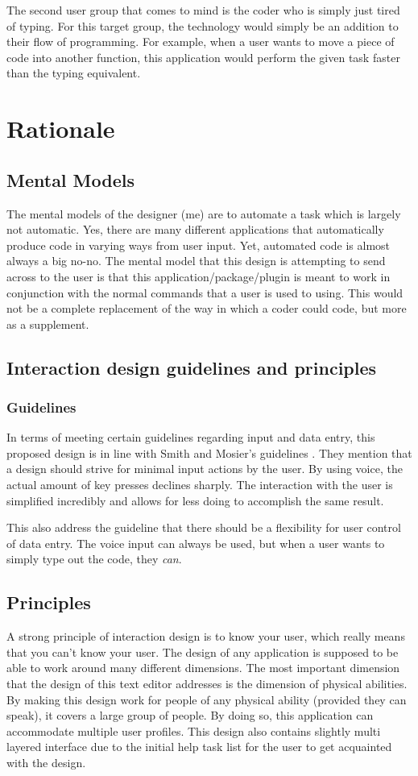 \documentclass[11pt, oneside]{article}
\begin{document}
The second user group that comes to mind is the coder who is simply just tired of typing. For this target group, the technology would simply be an addition to their flow of programming. For example, when a user wants to move a piece of code into another function, this application would perform the given task faster than the typing equivalent.


\section{Rationale}

\subsection{Mental Models}
The mental models of the designer (me) are to automate a task which is largely not automatic. Yes, there are many different applications that automatically produce code in varying ways from user input. Yet, automated code is almost always a big no-no. The mental model that this design is attempting to send across to the user is that this application/package/plugin is meant to work in conjunction with the normal commands that a user is used to using. This would not be a complete replacement of the way in which a coder could code, but more as a supplement.

\subsection{Interaction design guidelines and principles}
\subsubsection{Guidelines}
In terms of meeting certain guidelines regarding input and data entry, this proposed design is in line with Smith and Mosier's guidelines \cite{guidelines}. They mention that a design should strive for minimal input actions by the user. By using voice, the actual amount of key presses declines sharply. The interaction with the user is simplified incredibly and allows for less doing to accomplish the same result.

This also address the guideline that there should be a flexibility for user control of data entry. The voice input can always be used, but when a user wants to simply type out the code, they \textit{can}.

\subsection{Principles}
A strong principle of interaction design is to know your user, which really means that you can't know your user. The design of any application is supposed to be able to work around many different dimensions. The most important dimension that the design of this text editor addresses is the dimension of physical abilities. By making this design work for people of any physical ability (provided they can speak), it covers a large group of people. By doing so, this application can accommodate multiple user profiles. This design also contains slightly multi layered interface due to the initial help task list for the user to get acquainted with the design.
\end{document}
